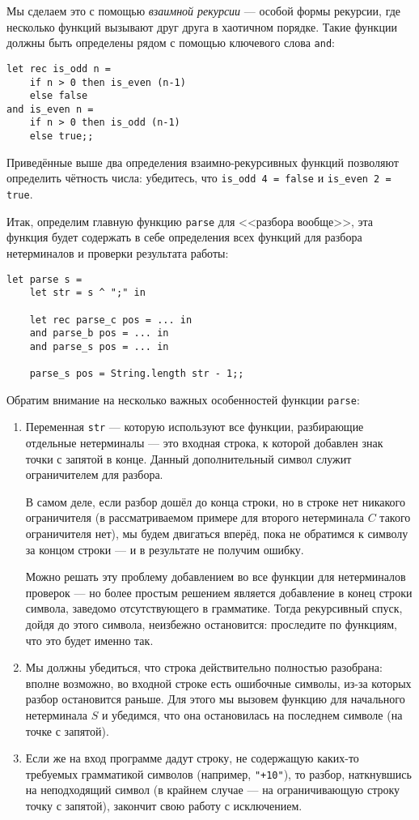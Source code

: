\documentclass[12pt]{article}
\begin{document}
Мы сделаем это с помощью \emph{взаимной рекурсии} --- особой формы рекурсии, где
несколько функций вызывают друг друга в хаотичном порядке. Такие функции должны быть
определены рядом с помощью ключевого слова \verb!and!:

\begin{verbatim}
let rec is_odd n = 
    if n > 0 then is_even (n-1)
    else false
and is_even n =
    if n > 0 then is_odd (n-1)
    else true;;
\end{verbatim}

\noindent Приведённые выше два определения взаимно-рекурсивных функций позволяют определить чётность
числа: убедитесь, что \verb!is_odd 4 = false! и \verb!is_even 2 = true!.

Итак, определим главную функцию \verb!parse! для <<разбора вообще>>, эта функция будет содержать 
в себе определения всех функций для разбора нетерминалов и проверки результата работы:

\begin{verbatim}
let parse s =
    let str = s ^ ";" in

    let rec parse_c pos = ... in
    and parse_b pos = ... in
    and parse_s pos = ... in

    parse_s pos = String.length str - 1;;
\end{verbatim}

Обратим внимание на несколько важных особенностей функции \verb!parse!:
\begin{enumerate}
\item Переменная \verb!str! --- которую используют все функции, разбирающие
отдельные нетерминалы --- это входная строка, к которой добавлен знак точки с
запятой в конце. Данный дополнительный символ служит ограничителем для разбора.

В самом деле, если разбор дошёл до конца строки, но в строке нет никакого ограничителя
(в рассматриваемом примере для второго нетерминала $C$ такого ограничителя нет), 
мы будем двигаться вперёд, пока не обратимся к символу за концом строки --- 
и в результате не получим ошибку.

Можно решать эту проблему добавлением во все функции для нетерминалов проверок 
--- но более простым решением является добавление в конец строки символа, заведомо
отсутствующего в грамматике. Тогда рекурсивный спуск, дойдя до этого символа,
неизбежно остановится: проследите по функциям, что это будет именно так.

\item Мы должны убедиться, что строка действительно полностью разобрана: вполне
возможно, во входной строке есть ошибочные символы, из-за которых разбор остановится
раньше. Для этого мы вызовем функцию для начального нетерминала $S$ и убедимся, что
она остановилась на последнем символе (на точке с запятой). 

\item Если же на вход программе дадут строку, не содержащую каких-то требуемых
грамматикой символов (например, \verb!"+10"!), то разбор, наткнувшись на неподходящий
символ (в крайнем случае --- на ограничивающую строку точку с запятой), закончит
свою работу с исключением.
\end{enumerate}
\end{document}
